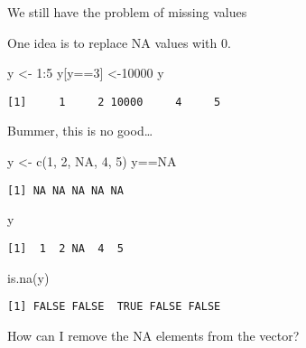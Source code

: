 \documentclass[
  letterpaper,
  DIV=11,
  numbers=noendperiod]{scrartcl}
\newenvironment{Shaded}{\begin{snugshade}}{\end{snugshade}}
\newcommand{\ConstantTok}[1]{\textcolor[rgb]{0.56,0.35,0.01}{#1}}
\newcommand{\DecValTok}[1]{\textcolor[rgb]{0.68,0.00,0.00}{#1}}
\newcommand{\FunctionTok}[1]{\textcolor[rgb]{0.28,0.35,0.67}{#1}}
\newcommand{\NormalTok}[1]{\textcolor[rgb]{0.00,0.23,0.31}{#1}}
\newcommand{\OtherTok}[1]{\textcolor[rgb]{0.00,0.23,0.31}{#1}}
\newcommand{\SpecialCharTok}[1]{\textcolor[rgb]{0.37,0.37,0.37}{#1}}
\begin{document}
We still have the problem of missing values

One idea is to replace NA values with 0.

\begin{Shaded}
\begin{Highlighting}[]
\NormalTok{y }\OtherTok{\textless{}{-}} \DecValTok{1}\SpecialCharTok{:}\DecValTok{5}
\NormalTok{y[y}\SpecialCharTok{==}\DecValTok{3}\NormalTok{] }\OtherTok{\textless{}{-}}\DecValTok{10000}
\NormalTok{y}
\end{Highlighting}
\end{Shaded}

\begin{verbatim}
[1]     1     2 10000     4     5
\end{verbatim}

Bummer, this is no good\ldots{}

\begin{Shaded}
\begin{Highlighting}[]
\NormalTok{y }\OtherTok{\textless{}{-}} \FunctionTok{c}\NormalTok{(}\DecValTok{1}\NormalTok{, }\DecValTok{2}\NormalTok{, }\ConstantTok{NA}\NormalTok{, }\DecValTok{4}\NormalTok{, }\DecValTok{5}\NormalTok{)}
\NormalTok{y}\SpecialCharTok{==}\ConstantTok{NA}
\end{Highlighting}
\end{Shaded}

\begin{verbatim}
[1] NA NA NA NA NA
\end{verbatim}

\begin{Shaded}
\begin{Highlighting}[]
\NormalTok{y}
\end{Highlighting}
\end{Shaded}

\begin{verbatim}
[1]  1  2 NA  4  5
\end{verbatim}

\begin{Shaded}
\begin{Highlighting}[]
\FunctionTok{is.na}\NormalTok{(y)}
\end{Highlighting}
\end{Shaded}

\begin{verbatim}
[1] FALSE FALSE  TRUE FALSE FALSE
\end{verbatim}

How can I remove the NA elements from the vector?
\end{document}

